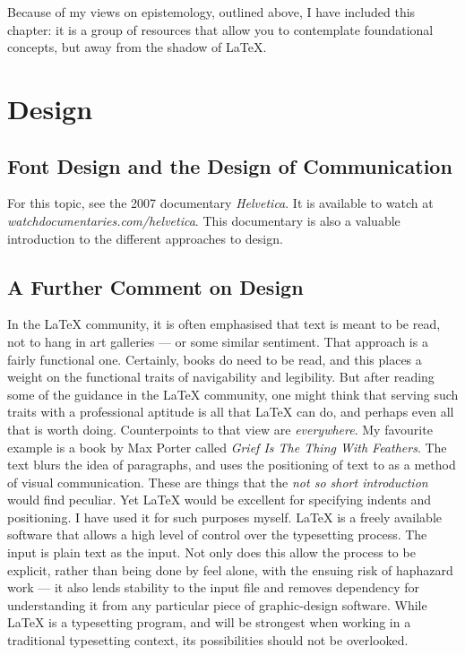 \documentclass[12pt, oneside]{memoir}
\begin{document}
Because of my views on epistemology, outlined above, I have included this chapter: it is a group of resources that allow you to contemplate foundational concepts, but away from the shadow of \LaTeX{}.

\section{Design}

\subsection*{Font Design and the Design of Communication}
For this topic, see the 2007 documentary \emph{Helvetica}. It is available to watch at \emph{watchdocumentaries.com/helvetica}. This documentary is also a valuable introduction to the different approaches to design. 

\subsection*{A Further Comment on Design}
In the \LaTeX{} community, it is often emphasised that text is meant to be read, not to hang in art galleries — or some similar sentiment. That approach is a fairly functional one. Certainly, books do need to be read, and this places a weight on the functional traits of navigability and 
legibility. But after reading some of the guidance in the \LaTeX{} community, one might think that serving such traits with a professional aptitude is all that \LaTeX{} can do, and perhaps even all that is worth doing. Counterpoints to that view are \emph{everywhere}. My favourite example is a book by Max Porter called \emph{Grief Is The Thing With Feathers}. The text blurs the idea of paragraphs, and uses the positioning of text to as a method of visual communication. These are things that the \emph{not so short introduction} would find peculiar. Yet \LaTeX{} would be excellent for specifying indents and positioning. I have used it for such purposes myself. \LaTeX{} is a freely available software that allows a high level of control over the typesetting process. The input is plain text as the input. Not only does this allow the process to be explicit, rather than being done by feel alone, with the ensuing risk of haphazard work — it also lends stability to the input file and removes dependency for understanding it from any particular piece of graphic-design software. While \LaTeX{} is a typesetting program, and will be strongest when working in a traditional typesetting context, its possibilities should not be overlooked.
\end{document}
